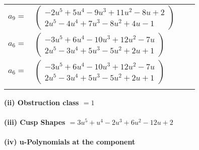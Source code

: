 \documentclass[1p]{elsarticle_modified}
\theoremstyle{definition}
\begin{document}
\begin{tabular}{m{7pt} m{180pt} m{7pt} m{180pt} }
\flushright $a_{9}=$&$\begin{pmatrix}-2 u^5+5 u^4-9 u^3+11 u^2-8 u+2\\2 u^5-4 u^4+7 u^3-8 u^2+4 u-1\end{pmatrix}$ \\
\flushright $a_{6}=$&$\begin{pmatrix}-3 u^5+6 u^4-10 u^3+12 u^2-7 u\\2 u^5-3 u^4+5 u^3-5 u^2+2 u+1\end{pmatrix}$\\ \flushright $a_{6}=$&$\begin{pmatrix}-3 u^5+6 u^4-10 u^3+12 u^2-7 u\\2 u^5-3 u^4+5 u^3-5 u^2+2 u+1\end{pmatrix}$\\&\end{tabular}
\flushleft \textbf{(ii) Obstruction class $= 1$}\\~\\
\flushleft \textbf{(iii) Cusp Shapes $= 3 u^5+u^4-2 u^3+6 u^2-12 u+2$}\\~\\
\newpage\renewcommand{\arraystretch}{1}
\flushleft \textbf{(iv) u-Polynomials at the component}\newline \\
\end{document}
